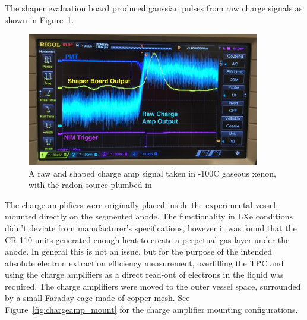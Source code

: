 The shaper evaluation board produced gaussian pulses from raw charge signals as shown in Figure~\ref{fig:shaper}.

\begin{figure}[htbp]
\begin{center}
\includegraphics[width=4in]{figures/testbed/charge_amp_shaper.jpg}
\caption{A raw and shaped charge amp signal taken in -100C gaseous xenon, with the radon source plumbed in}
\label{fig:shaper}
\end{center}
\end{figure}

The charge amplifiers were originally placed inside the experimental vessel, mounted directly on the segmented anode. The functionality in \ac{LXe} conditions didn't deviate from manufacturer's specifications, however it was found that the CR-110 units generated enough heat to create a perpetual gas layer under the anode. In general this is not an issue, but for the purpose of the intended absolute electron extraction efficiency measurement, overfilling the \ac{TPC} and using the charge amplifiers as a direct read-out of electrons in the liquid was required. The charge amplifiers were moved to the outer vessel space, surrounded by a small Faraday cage made of copper mesh. See Figure~\ref{fig:chargeamp_mount} for the charge amplifier mounting configurations.


